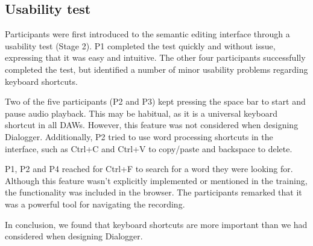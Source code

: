 

\subsection{Usability test}
Participants were first introduced to the semantic editing interface through a
usability test (Stage 2). P1 completed the test quickly and without issue,
expressing that it was easy and intuitive. The other four participants
successfully completed the test, but identified a number of minor usability
problems regarding keyboard shortcuts.

Two of the five participants (P2 and P3) kept pressing the space bar to start
and pause audio playback. This may be habitual, as it is a universal keyboard
shortcut in all DAWs. However, this feature was not considered when designing
Dialogger.  Additionally, P2 tried to use word processing shortcuts in the
interface, such as Ctrl+C and Ctrl+V to copy/paste and backspace to delete.

P1, P2 and P4 reached for Ctrl+F to search for a word they were
looking for. Although this feature wasn't explicitly implemented or mentioned in the
training, the functionality was included in the browser. The participants
remarked that it was a powerful tool for navigating the recording.

In conclusion, we found that keyboard shortcuts are more important than we had
considered when designing Dialogger.


